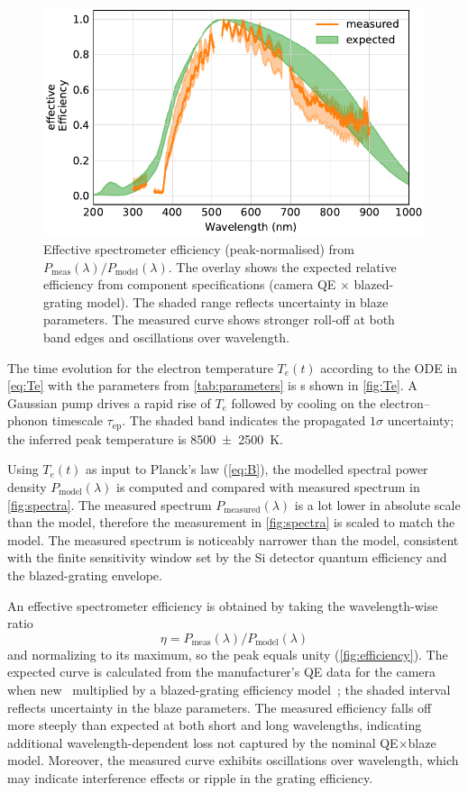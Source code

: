 \documentclass[
	parskip=half,
	a4paper,
]{scrarticle}
\begin{document}
\begin{figure}
    \centering
    \includegraphics{../analysis/figures/efficiency de.pdf}
    \caption{Effective spectrometer efficiency (peak-normalised) from \(P_{\text{meas}}(\lambda)/P_{\text{model}}(\lambda)\). The overlay shows the expected relative efficiency from component specifications (camera QE \(\times\) blazed-grating model). The shaded range reflects uncertainty in blaze parameters. The measured curve shows stronger roll-off at both band edges and oscillations over wavelength.}
    \label{fig:efficiency}
\end{figure}

The time evolution for the electron temperature \(T_e(t)\) according to the ODE in \autoref{eq:Te} with the parameters from \autoref{tab:parameters} is s shown in \autoref{fig:Te}.
A Gaussian pump drives a rapid rise of \(T_e\) followed by cooling on the electron–phonon timescale \(\tau_{\mathrm{ep}}\). The shaded band indicates the propagated $1\sigma$ uncertainty; the inferred peak temperature is \SI{8500(2500)}{\kelvin}.

Using \(T_e(t)\) as input to Planck’s law (\autoref{eq:B}), the modelled spectral power density \(P_\text{model}(\lambda)\) is computed and compared with measured spectrum in \autoref{fig:spectra}. 
The measured spectrum \(P_\text{measured}(\lambda)\) is a lot lower in absolute scale than the model, therefore the measurement in \autoref{fig:spectra} is scaled to match the model. The measured spectrum is noticeably narrower than the model, consistent with the finite sensitivity window set by the Si detector quantum efficiency and the blazed-grating envelope.

An effective spectrometer efficiency is obtained by taking the wavelength-wise ratio \[\eta = P_{\text{meas}}(\lambda)/P_{\text{model}}(\lambda)\] and normalizing to its maximum, so the peak equals unity (\autoref{fig:efficiency}). The expected curve is calculated from the manufacturer’s QE data for the camera when new~\cite{andor_ixonem_nodate} multiplied by a blazed-grating efficiency model~\cite{barker_ripple_1984}; the shaded interval reflects uncertainty in the blaze parameters. The measured efficiency falls off more steeply than expected at both short and long wavelengths, indicating additional wavelength-dependent loss not captured by the nominal QE\(\times\)blaze model. Moreover, the measured curve exhibits oscillations over wavelength, which may indicate interference effects or ripple in the grating efficiency.
\end{document}
